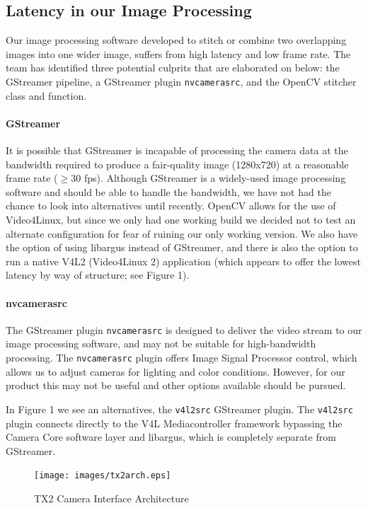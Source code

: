\documentclass[letterpaper,10pt,serif,draftclsnofoot,onecolumn,compsoc,titlepage]{IEEEtran}
\begin{document}
\subsection{Latency in our Image Processing}
Our image processing software developed to stitch or combine two overlapping 
images into one wider image, suffers from high latency and low frame rate. The team has 
identified three potential culprits that are elaborated on below: the GStreamer pipeline, 
a GStreamer plugin \texttt{nvcamerasrc}, and the OpenCV stitcher class and function. 

\paragraph*{GStreamer} It is possible that GStreamer is incapable of processing the camera 
data at the bandwidth required to produce a fair-quality image (1280x720) at a reasonable 
frame rate ($\ge$30 fps). Although GStreamer is a widely-used image processing software 
and should be able to handle the bandwidth, we have not had the chance to look into 
alternatives until recently. OpenCV allows for the use of Video4Linux, but since we only 
had one working build we decided not to test an alternate configuration for fear of 
ruining our only working version. We also have the option of using libargus instead of 
GStreamer, and there is also the option to run a native V4L2 (Video4Linux 2) application 
(which appears to offer the lowest latency by way of structure; see Figure 1).

\paragraph*{nvcamerasrc} The GStreamer plugin \texttt{nvcamerasrc} is designed to deliver 
the video stream to our image processing software, and may not be suitable for 
high-bandwidth processing. The \texttt{nvcamerasrc} plugin offers Image Signal Processor 
control, which allows us to adjust cameras for lighting and color conditions. 
However, for our product this may not be useful and other options available should be 
pursued. 

In Figure 1 we see an alternatives, the \texttt{v4l2src} GStreamer plugin. The 
\texttt{v4l2src} plugin connects directly to the V4L Mediacontroller framework bypassing 
the Camera Core software layer and libargus, which is completely separate from GStreamer.

\begin{figure}[H]
  	\centering
	\label{fig:tx2arch}
	\texttt{[image: images/tx2arch.eps]}
	\caption{TX2 Camera Interface Architecture \label{overflow}}
\end{figure}
\end{document}
